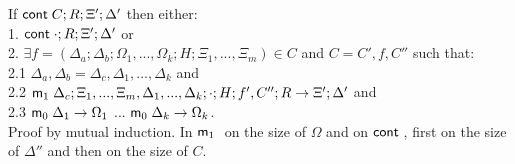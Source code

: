 If $\mathsf{cont} \; C; R; \Xi'; \Delta'$ then either:\\
1. \hspace{1cm} $\mathsf{cont} \; \cdot; R; \Xi'; \Delta'$ or \\
2. \hspace{1cm} $\exists f = (\Delta_a; \Delta_b; \Omega_1, ..., \Omega_k; H; \Xi_1, ..., \Xi_m) \in C$ and $C = C', f, C''$ such that:\\
2.1 \hspace{2cm} $\Delta_a, \Delta_b = \Delta_c, \Delta_1, ..., \Delta_k$ and \\
2.2 \hspace{2cm} $\mathsf{m}_1 \; \Delta_c; \Xi_1, ..., \Xi_m, \Delta_1, ..., \Delta_k; \cdot; H; f', C''; R \rightarrow \Xi'; \Delta'$ and \\
2.3 \hspace{2cm} $\mathsf{m}_0 \; \Delta_1 \rightarrow \Omega_1$ ... $\mathsf{m}_0 \; \Delta_k \rightarrow \Omega_k$.\\

Proof by mutual induction. In $\mathsf{m}_1 \;$ on the size of $\Omega$ and on $\mathsf{cont} \;$, first on the size of $\Delta''$ and then on the size of $C$.

